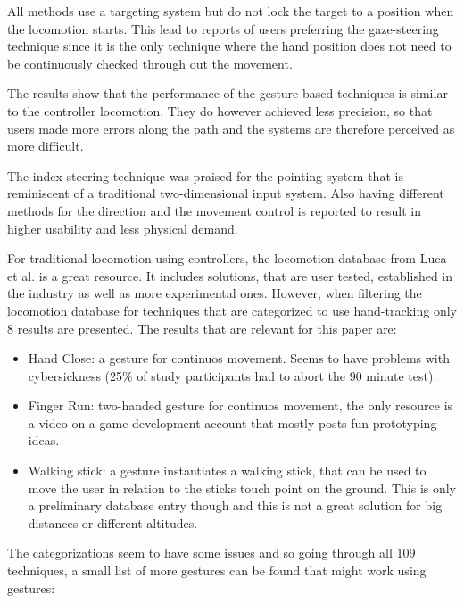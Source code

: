 All methods use a targeting system but do not lock the target to a position when the locomotion starts. This lead to reports of users preferring the gaze-steering technique since it is the only technique where the hand position does not need to be continuously checked through out the movement.

The results show that the performance of the gesture based techniques is similar to the controller locomotion. They do however achieved less precision, so that users made more errors along the path and the systems are therefore perceived as more difficult. 

The index-steering technique was praised for the pointing system that is reminiscent of a traditional two-dimensional input system. Also having different methods for the direction and the movement control is reported to result in higher usability and less physical demand. 





For traditional locomotion using controllers, the locomotion database from Luca et al. \cite{Luca} is a great resource. It includes solutions, that are user tested, established in the industry as well as more experimental ones. However, when filtering the locomotion database for techniques that are categorized to use hand-tracking only 8 results are presented.
The results that are relevant for this paper are:

\begin{itemize}
\item
  Hand Close: a gesture for continuos movement. Seems to have problems
  with cybersickness (25\% of study participants had to
  abort the 90 minute test). \cite{Huang}
\item
  Finger Run: two-handed gesture for continuos movement, the only
  resource is a video on a game development account that mostly posts fun
  prototyping ideas. \cite{Beauchamp}
\item
  Walking stick: a gesture instantiates a walking stick, that can be
  used to move the user in relation to the sticks touch point on the
  ground. This is only a preliminary database entry though and this is
  not a great solution for big distances or different altitudes. %
\end{itemize}

The categorizations seem to have some issues and so going through all
109 techniques, a small list of more gestures can be found that might work using gestures:

